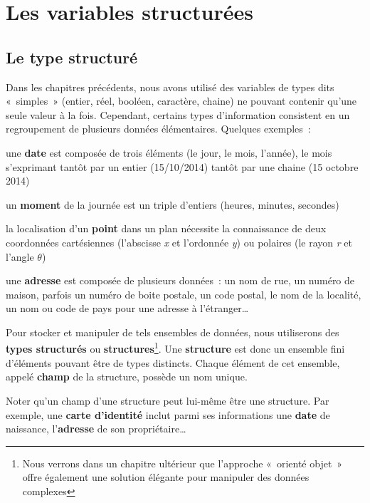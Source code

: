 \chapter{Les variables structurées}

\section{Le type structuré}

	Dans les chapitres précédents, nous avons utilisé des variables de types
	dits «~simples~» (entier, réel, booléen, caractère, chaine) ne pouvant
	contenir qu’une seule valeur à la fois. Cependant, certains types
	d’information consistent en un regroupement de plusieurs données
	élémentaires. Quelques exemples~:

	\begin{liste}
	\item {
		une \textbf{date} est composée de trois éléments (le jour, le mois,
		l’année), le mois s’exprimant tantôt par un entier (15/10/2014) tantôt
		par une chaine (15 octobre 2014)}
	\item {
		un \textbf{moment} de la journée est un triple d’entiers (heures,
		minutes, secondes)}
	\item {
		la localisation d’un \textbf{point} dans un plan nécessite la
		connaissance de deux coordonnées cartésiennes (l’abscisse \textit{x} et
		l’ordonnée \textit{y}) ou polaires (le rayon \textit{r} et l’angle
		\textit{$\theta $})}
	\item {
		une \textbf{adresse }est composée de plusieurs données~: un nom de rue,
		un numéro de maison, parfois un numéro de boite postale, un code
		postal, le nom de la localité, un nom ou code de pays pour une adresse
		à l’étranger\dots}
	\end{liste}

	Pour stocker et manipuler de tels ensembles de données, nous utiliserons
	des \textbf{types structurés} ou \textbf{structures}\footnote{Nous
	verrons dans un chapitre ultérieur que l'approche
	«~orienté objet~» offre également une solution élégante pour manipuler
	des données complexes}. Une \textbf{structure} est donc un ensemble
	fini d’éléments pouvant être de types distincts. Chaque élément de cet
	ensemble, appelé \textbf{champ} de la structure, possède un nom unique.
	
	Noter qu’un champ d’une structure peut lui-même être une structure. Par
	exemple, une \textbf{carte d’identité} inclut parmi ses informations
	une \textbf{date} de naissance, l’\textbf{adresse} de son
	propriétaire\dots

